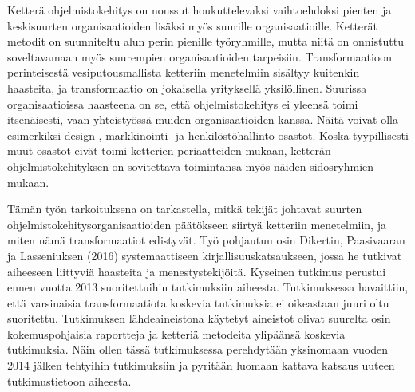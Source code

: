 Ketterä ohjelmistokehitys on noussut houkuttelevaksi vaihtoehdoksi
pienten ja keskisuurten organisaatioiden lisäksi myös suurille
organisaatioille. Ketterät metodit on suunniteltu alun perin
pienille työryhmille, mutta niitä on onnistuttu soveltavamaan myös
suurempien organisaatioiden tarpeisiin. Transformaatioon perinteisestä
vesiputousmallista ketteriin menetelmiin sisältyy kuitenkin haasteita,
ja transformaatio on jokaisella yrityksellä yksilöllinen. Suurissa
organisaatioissa haasteena on se, että ohjelmistokehitys ei yleensä
toimi itsenäisesti, vaan yhteistyössä muiden organisaatioiden
kanssa. Näitä voivat olla esimerkiksi design-, markkinointi- ja
henkilöstöhallinto-osastot. Koska tyypillisesti muut osastot eivät
toimi ketterien periaatteiden mukaan, ketterän ohjelmistokehityksen on
sovitettava toimintansa myös näiden sidosryhmien mukaan.

Tämän työn tarkoituksena on tarkastella, mitkä tekijät johtavat
suurten ohjelmistokehitysorganisaatioiden päätökseen siirtyä
ketteriin menetelmiin, ja miten nämä transformaatiot edistyvät.
Työ pohjautuu osin Dikertin, Paasivaaran ja Lasseniuksen (2016)
systemaattiseen kirjallisuuskatsaukseen, jossa he tutkivat aiheeseen
liittyviä haasteita ja menestystekijöitä. Kyseinen tutkimus perustui
ennen vuotta 2013 suoritettuihin tutkimuksiin aiheesta. Tutkimuksessa
havaittiin, että varsinaisia transformaatiota koskevia tutkimuksia
ei oikeastaan juuri oltu suoritettu. Tutkimuksen lähdeaineistona
käytetyt aineistot olivat suurelta osin kokemuspohjaisia raportteja
ja ketteriä metodeita ylipäänsä koskevia tutkimuksia. Näin ollen
tässä tutkimuksessa perehdytään yksinomaan vuoden 2014 jälken
tehtyihin tutkimuksiin ja pyritään luomaan kattava katsaus uuteen
tutkimustietoon aiheesta.

